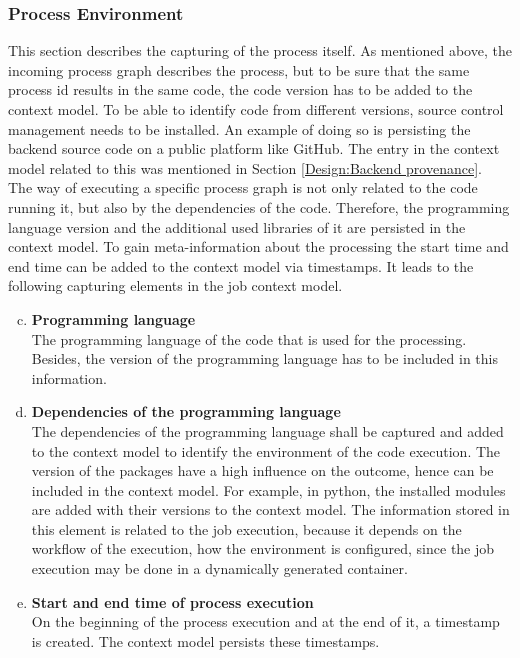 \documentclass[draft,final]{vutinfth} %
\begin{document}
\subsubsection{Process Environment}\label{Job:Process Data}
This section describes the capturing of the process itself. As mentioned above, the incoming process graph describes the process, but to be sure that the same process id results in the same code, the code version has to be added to the context model. To be able to identify code from different versions, source control management needs to be installed. An example of doing so is persisting the backend source code on a public platform like GitHub. The entry in the context model related to this was mentioned in Section \ref{Design:Backend provenance}.  \\
The way of executing a specific process graph is not only related to the code running it, but also by the dependencies of the code. Therefore, the programming language version and the additional used libraries of it are persisted in the context model. To gain meta-information about the processing the start time and end time can be added to the context model via timestamps. It leads to the following capturing elements in the job context model.

\begin{enumerate}[(a)]
	\setcounter{enumi}{2}
	\item \textbf{Programming language}\\
	The programming language of the code that is used for the processing. Besides, the version of the programming language has to be included in this information.
	\item \textbf{Dependencies of the programming language}\\
	The dependencies of the programming language shall be captured and added to the context model to identify the environment of the code execution. The version of the packages have a high influence on the outcome, hence can be included in the context model. For example, in python, the installed modules are added with their versions to the context model. The information stored in this element is related to the job execution, because it depends on the workflow of the execution, how the environment is configured, since the job execution may be done in a dynamically generated container.
	\item \textbf{Start and end time of process execution}\\
	On the beginning of the process execution and at the end of it, a timestamp is created. The context model persists these timestamps.
\end{enumerate}
\end{document}
